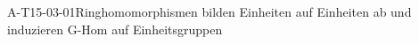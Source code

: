 
\begin{PROP}{A-T15-03-01}{Ringhomomorphismen bilden Einheiten auf Einheiten ab und induzieren G-Hom auf Einheitsgruppen}
\end{PROP}
